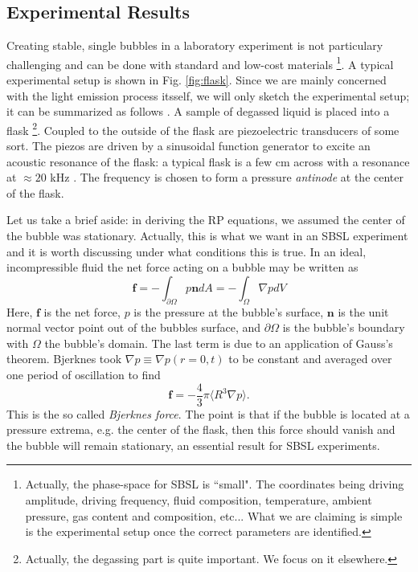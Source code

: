 \documentclass[rmp,aps,nofootinbib,superscriptaddress,floatfix]{revtex4-2}
\begin{document}
\subsection{Experimental Results}
Creating stable, single bubbles in a laboratory experiment is not particulary challenging and can be done with standard and low-cost materials \footnote{Actually, the phase-space for SBSL is ``small". The coordinates being driving amplitude, driving frequency, fluid composition, temperature, ambient pressure, gas content and composition, etc... What we are claiming is simple is the experimental setup once the correct parameters are identified.}. A typical experimental setup is shown in Fig. \ref{fig:flask}. Since we are mainly concerned with the light emission process itsself, we will only sketch the experimental setup; it can be summarized as follows \cite{lentz1995mie,gaitan1990experimental,gaitan1992sonoluminescence,gompf2000mie,brenner2002single,yasui2018acoustic,brennen2014cavitation,suslick2008inside}. A sample of degassed liquid is placed into a flask \footnote{Actually, the degassing part is quite important. We focus on it elsewhere.}. Coupled to the outside of the flask are piezoelectric transducers of some sort. The piezos are driven by a sinusoidal function generator to excite an acoustic resonance of the flask: a typical flask is a few cm across with a resonance at $\approx 20$ kHz \cite{brenner2002single}. The frequency is chosen to form a pressure \emph{antinode} at the center of the flask.

Let us take a brief aside: in deriving the RP equations, we assumed the center of the bubble was stationary. Actually, this is what we want in an SBSL experiment and it is worth discussing under what conditions this is true. In an ideal, incompressible fluid the net force acting on a bubble may be written as 
\begin{equation}
    \bm{f}=-\int_{\partial \Omega} p \bm{n} dA = -\int_\Omega \nabla p dV
\end{equation}
Here, $\bm{f}$ is the net force, $p$ is the pressure at the bubble's surface, $\bm{n}$ is the unit normal vector point out of the bubbles surface, and $\partial \Omega$ is the bubble's boundary with $\Omega$ the bubble's domain. The last term is due to an application of Gauss's theorem. Bjerknes \cite{bjerknes1909kraftfelder} took $\nabla p \equiv \nabla p(r=0,t)$ to be constant and averaged over one period of oscillation to find 
\begin{equation}
    \bm{f} = -\frac{4}{3}\pi \langle R^3 \nabla p \rangle.
    \label{eq:Bj_force}
\end{equation}
This is the so called \emph{Bjerknes force}. The point is that if the bubble is located at a pressure extrema, e.g. the center of the flask, then this force should vanish and the bubble will remain stationary, an essential result for SBSL experiments.
\end{document}
